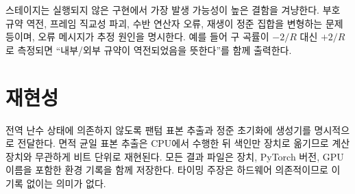 스테이지는 실행되지 않은 구현에서 가장 발생 가능성이 높은 결함을 겨냥한다. 부호 규약
역전, 프레임 직교성 파괴, 수반 연산자 오류, 재생이 정준 집합을 변형하는 문제 등이며,
오류 메시지가 추정 원인을 명시한다. 예를 들어 구 곡률이 $-2/R$ 대신 $+2/R$로 측정되면
``내부/외부 규약이 역전되었음을 뜻한다''를 함께 출력한다.

\section{재현성}

전역 난수 상태에 의존하지 않도록 팬텀 표본 추출과 정준 초기화에 생성기를 명시적으로
전달한다. 면적 균일 표본 추출은 CPU에서 수행한 뒤 색인만 장치로 옮기므로 계산 장치와
무관하게 비트 단위로 재현된다. 모든 결과 파일은 장치, PyTorch 버전, GPU 이름을 포함한
환경 기록을 함께 저장한다. 타이밍 주장은 하드웨어 의존적이므로 이 기록 없이는 의미가
없다.
